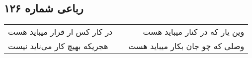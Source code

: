 \begin{center}
\section*{رباعی شماره ۱۲۶}
\label{sec:sh126}
\begin{longtable}{l p{0.5cm} r}
در کار کس ار قرار میباید هست
&&
وین یار که در کنار میباید هست
\\
هجریکه بهیچ کار می‌ناید نیست
&&
وصلی که چو جان بکار میباید هست
\\
\end{longtable}
\end{center}
